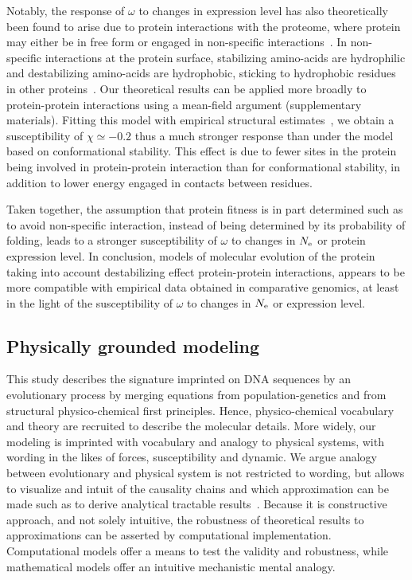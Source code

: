 Notably, the response of $\omega$ to changes in expression level has also theoretically been found to arise due to protein interactions with the proteome, where protein may either be in free form or engaged in non-specific interactions~\citep{Yang2012, Zhang2013}.
In non-specific interactions at the protein surface, stabilizing amino-acids are hydrophilic and destabilizing amino-acids are hydrophobic, sticking to hydrophobic residues in other proteins~\citep{Dixit2013,Manhart2015}.
Our theoretical results can be applied more broadly to protein-protein interactions using a mean-field argument (supplementary materials).
Fitting this model with empirical structural estimates~\citep{Janin1995a, Zhang2008}, we obtain a susceptibility of $\chi \simeq -0.2$ thus a much stronger response than under the model based on conformational stability.
This effect is due to fewer sites in the protein being involved in protein-protein interaction than for conformational stability, in addition to lower energy engaged in contacts between residues.

Taken together, the assumption that protein fitness is in part determined such as to avoid non-specific interaction, instead of being determined by its probability of folding, leads to a stronger susceptibility of $\omega$ to changes in $N_{\mathrm{e}}$ or protein expression level.
In conclusion, models of molecular evolution of the protein taking into account destabilizing effect protein-protein interactions, appears to be more compatible with empirical data obtained in comparative genomics, at least in the light of the susceptibility of $\omega$ to changes in $N_{\mathrm{e}}$ or expression level.

\subsection{Physically grounded modeling}
This study describes the signature imprinted on \acrshort{DNA} sequences by an evolutionary process by merging equations from population-genetics and from structural physico-chemical first principles.
Hence, physico-chemical vocabulary and theory are recruited to describe the molecular details.
More widely, our modeling is imprinted with vocabulary and analogy to physical systems, with wording in the likes of forces, susceptibility and dynamic.
We argue analogy between evolutionary and physical system is not restricted to wording, but allows to visualize and intuit of the causality chains and which approximation can be made such as to derive analytical tractable results~\citep{Sella2005, Mustonen2009, Bastolla2012, Bastolla2017}.
Because it is constructive approach, and not solely intuitive, the robustness of theoretical results to approximations can be asserted by computational implementation. 
Computational models offer a means to test the validity and robustness, while mathematical models offer an intuitive mechanistic mental analogy.

